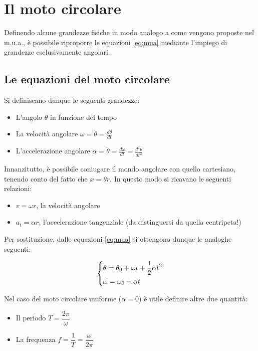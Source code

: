 \section{Il moto circolare}

Definendo alcune grandezze fisiche in modo analogo a come vengono
proposte nel m.u.a., è possibile riproporre le equazioni \ref{eq:mua}
mediante l'impiego di grandezze esclusivamente angolari.

\subsection{Le equazioni del moto circolare}

Si definiscano dunque le seguenti grandezze:

\begin{itemize}
    \item L'angolo $\theta$ in funzione del tempo
    \item La velocità angolare $\displaystyle \omega=\dot{\theta}=\frac{d\theta}{dt}$
    \item L'accelerazione angolare $\displaystyle \alpha=\ddot{\theta}=\frac{d\omega}{dt}=\frac{d^2\theta}{dt^2}$
\end{itemize}

Innanzitutto, è possibile coniugare il mondo angolare con quello
cartesiano, tenendo conto del fatto che $x=\theta r$. In questo modo
si ricavano le seguenti relazioni:

\begin{itemize}
    \item $\displaystyle v=\omega r$, la velocità angolare
    \item $\displaystyle a_t=\alpha r$, l'accelerazione tangenziale
    (da distinguersi da quella centripeta!)
\end{itemize}

Per sostituzione, dalle equazioni \ref{eq:mua} si ottengono dunque
le analoghe seguenti:

\begin{equation}
    \begin{dcases}
        \theta = \theta_0 + \omega t + \frac12 \alpha t^2 \\
        \omega = \omega_0 + \alpha t
    \end{dcases}
\end{equation}

Nel caso del moto circolare uniforme ($\alpha=0$) è utile definire
altre due quantità:

\begin{itemize}
    \item Il periodo $T=\dfrac{2\pi}{\omega}$
    \item La frequenza $f=\dfrac{1}{T}=\dfrac{\omega}{2\pi}$
\end{itemize}

